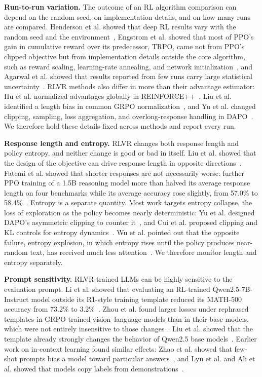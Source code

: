 \documentclass[ai,article,submit,oneauthor]{Definitions/mdpi}
\begin{document}
\noindent\textbf{Run-to-run variation.}
The outcome of an RL algorithm comparison can depend on the random seed, on implementation details, and on how many runs are compared. Henderson et al. showed that deep RL results vary with the random seed and the environment~\cite{henderson2018matters}, Engstrom et al. showed that most of PPO's gain in cumulative reward over its predecessor, TRPO, came not from PPO's clipped objective but from implementation details outside the core algorithm, such as reward scaling, learning-rate annealing, and network initialization~\cite{engstrom2020implementation}, and Agarwal et al. showed that results reported from few runs carry large statistical uncertainty~\cite{agarwal2021precipice}. RLVR methods also differ in more than their advantage estimator: Hu et al. normalized advantages globally in REINFORCE++~\cite{hu2025reinforce++}, Liu et al. identified a length bias in common GRPO normalization~\cite{liu2025understanding}, and Yu et al. changed clipping, sampling, loss aggregation, and overlong-response handling in DAPO~\cite{yu2025dapo}. We therefore hold these details fixed across methods and report every run.

\noindent\textbf{Response length and entropy.}
RLVR changes both response length and policy entropy, and neither change is good or bad in itself. Liu et al. showed that the design of the objective can drive response length in opposite directions~\cite{liu2026luspo}. Fatemi et al. showed that shorter responses are not necessarily worse: further PPO training of a 1.5B reasoning model more than halved its average response length on four benchmarks while its average accuracy rose slightly, from 57.0\% to 58.4\%~\cite{fatemi2025concise}. Entropy is a separate quantity. Most work targets entropy collapse, the loss of exploration as the policy becomes nearly deterministic: Yu et al. designed DAPO's asymmetric clipping to counter it~\cite{yu2025dapo}, and Cui et al. proposed clipping and KL controls for entropy dynamics~\cite{cui2025entropy}. Wu et al. pointed out that the opposite failure, entropy explosion, in which entropy rises until the policy produces near-random text, has received much less attention~\cite{wu2025quantile}. We therefore monitor length and entropy separately.

\noindent\textbf{Prompt sensitivity.}
RLVR-trained LLMs can be highly sensitive to the evaluation prompt. Li et al. showed that evaluating an RL-trained Qwen2.5-7B-Instruct model outside its R1-style training template reduced its MATH-500 accuracy from 73.2\% to 3.2\%~\cite{li2025onedomain}. Zhou et al. found larger losses under rephrased templates in GRPO-trained vision--language models than in their base models, which were not entirely insensitive to those changes~\cite{zhou2026promptrobustness}. Liu et al. showed that the template already strongly changes the behavior of Qwen2.5 base models~\cite{liu2025understanding}. Earlier work on in-context learning found similar effects: Zhao et al. showed that few-shot prompts bias a model toward particular answers~\cite{zhao2021calibrate}, and Lyu et al. and Ali et al. showed that models copy labels from demonstrations~\cite{lyu2023zicl,ali2026copybias}.
\end{document}
